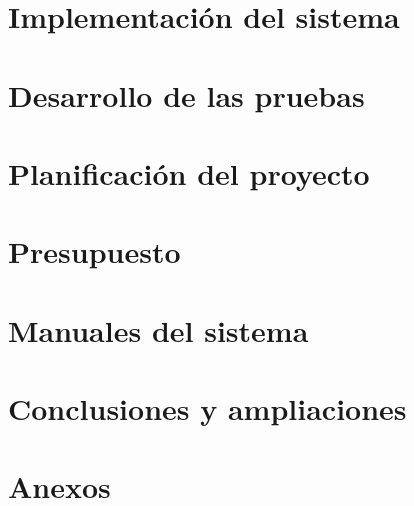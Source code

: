 \documentclass{report}
\begin{document}
\chapter{Implementación del sistema}
\label{chapter:implementacion}


\chapter{Desarrollo de las pruebas}
\label{chapter:desarrollo_pruebas}


\chapter{Planificación del proyecto}
\label{chapter:planificacion}


\chapter{Presupuesto}
\label{chapter:presupuesto}


\chapter{Manuales del sistema}
\label{chapter08}


\chapter{Conclusiones y ampliaciones}
\label{chapter:conclusiones_ampliaciones}


\chapter{Anexos}
\label{anexos}


\nocite{*}

\printbibliography
\end{document}
